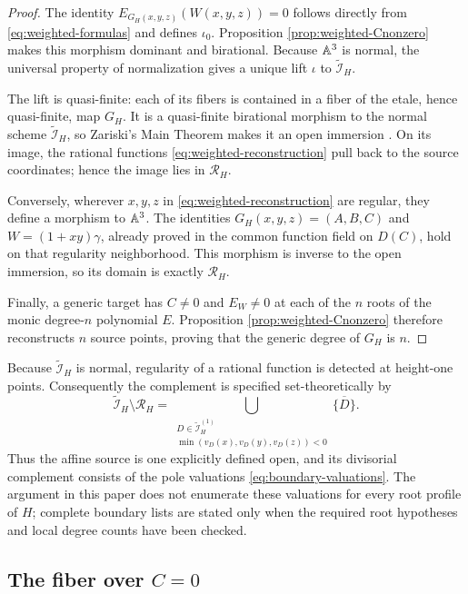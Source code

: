 \begin{proof}
The identity $E_{G_H(x,y,z)}(W(x,y,z))=0$ follows directly from
\eqref{eq:weighted-formulas} and defines $\iota_0$.  Proposition
\ref{prop:weighted-Cnonzero} makes this morphism dominant and birational.
Because $\mathbb A^3$ is normal, the universal property of normalization gives a
unique lift $\iota$ to $\widetilde{\mathcal I}_H$.

The lift is quasi-finite: each of its fibers is contained in a fiber of the
etale, hence quasi-finite, map $G_H$.  It is a quasi-finite birational
morphism to the normal scheme $\widetilde{\mathcal I}_H$, so Zariski's Main
Theorem makes it an open immersion \cite{stacks-zmt}.  On its image, the rational functions
\eqref{eq:weighted-reconstruction} pull back to the source coordinates;
hence the image lies in $\mathcal R_H$.

Conversely, wherever $x,y,z$ in \eqref{eq:weighted-reconstruction} are
regular, they define a morphism to $\mathbb A^3$.  The identities
$G_H(x,y,z)=(A,B,C)$ and $W=(1+xy)\gamma$, already proved in the common
function field on $D(C)$, hold on that regularity neighborhood.  This
morphism is inverse to the open immersion, so its domain is exactly
$\mathcal R_H$.

Finally, a generic target has $C\ne0$ and $E_W\ne0$ at each of the $n$ roots
of the monic degree-$n$ polynomial $E$.  Proposition
\ref{prop:weighted-Cnonzero} therefore reconstructs $n$ source points, proving
that the generic degree of $G_H$ is $n$.
\end{proof}

Because $\widetilde{\mathcal I}_H$ is normal, regularity of a rational
function is detected at height-one points.  Consequently the complement is
specified set-theoretically by
\begin{equation}\label{eq:boundary-valuations}
 \widetilde{\mathcal I}_H\setminus\mathcal R_H
 =\bigcup_{\substack{D\in\widetilde{\mathcal I}_H^{(1)}\\
 \min(v_D(x),v_D(y),v_D(z))<0}}
 \overline{\{D\}}.
\end{equation}
Thus the affine source is one explicitly defined open, and its divisorial
complement consists of the pole valuations \eqref{eq:boundary-valuations}.
The argument in this paper does not enumerate these valuations for every root
profile of $H$; complete boundary lists are stated only when the required
root hypotheses and local degree counts have been checked.

\subsection{The fiber over \texorpdfstring{$C=0$}{C=0}}

